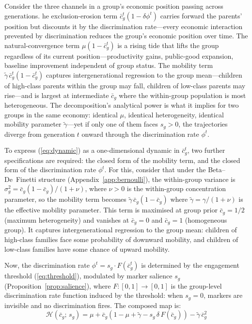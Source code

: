 \documentclass[12pt,a4paper]{article}
\theoremstyle{definition}
\numberwithin{proposition}{subsection}
\begin{document}
Consider the three channels in a group's economic position
passing across generations. he exclusion-erosion term $\bar{c}_g^t(1 - \delta \phi^t)$ carries
forward the parents' position but discounts it by the discrimination
rate---every economic interaction prevented by discrimination
reduces the group's economic position over time. The
natural-convergence term $\mu(1 - \bar{c}_g^t)$ is a rising tide
that lifts the group regardless of its current position---productivity
gains, public-good expansion, baseline improvement independent of
group status. The mobility term $\tilde{\gamma}\,\bar{c}_g^t(1-\bar{c}_g^t)$
captures intergenerational regression to the group mean---children
of high-class parents within the group may fall, children of
low-class parents may rise---and is largest at intermediate $\bar{c}_g$
where the within-group population is most heterogeneous. The
decomposition's analytical power is what it implies for two groups
in the same economy: identical $\mu$, identical heterogeneity,
identical mobility parameter $\tilde{\gamma}$---yet if only one of
them faces $s_g > 0$, the trajectories diverge from generation $t$
onward through the discrimination rate $\phi^t$.

To express (\ref{eq:dynamic}) as a one-dimensional dynamic in
$\bar{c}_g^t$, two further specifications are required: the closed
form of the mobility term, and the closed form of the discrimination
rate $\phi^t$. For this, consider that under the Beta--De~Finetti structure
(Appendix~\ref{app:bernoulli}), the within-group variance is
$\sigma_g^2 = \bar{c}_g(1-\bar{c}_g)/(1+\nu)$, where $\nu > 0$ is
the within-group concentration parameter, so the mobility term
becomes $\tilde{\gamma}\,\bar{c}_g(1-\bar{c}_g)$ where
$\tilde{\gamma} = \gamma/(1+\nu)$ is the effective mobility
parameter. This term is maximised at
group prior $\bar{c}_g = 1/2$ (maximum heterogeneity) and vanishes at $\bar{c}_g = 0$
and $\bar{c}_g = 1$ (homogeneous group). It captures
intergenerational regression to the group mean: children of
high-class families face some probability of downward mobility, and
children of low-class families have some chance of upward mobility.

Now, the discrimination rate $\phi^t = s_g \cdot F(\bar{c}_g^t)$ is
determined by the engagement threshold (\ref{eq:threshold}),
modulated by marker salience $s_g$
(Proposition~\ref{prop:salience}), where $F: [0,1] \to [0,1]$ is
the group-level discrimination rate function induced by the
threshold: when $s_g = 0$, markers are
invisible and no discrimination fires. The composed map is:
\begin{equation}
  \mathcal{H}(\bar{c}_g;\, s_g) = \mu + \bar{c}_g(1 - \mu + \tilde{\gamma}
  - s_g\,\delta\, F(\bar{c}_g))
  - \tilde{\gamma}\,\bar{c}_g^2
  \label{eq:composed}
\end{equation}
\end{document}

